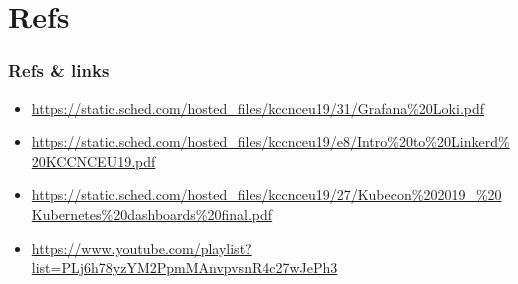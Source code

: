 \documentclass[default]{beamer}
\begin{document}
\section{Refs}
\begin{frame}
  \frametitle{Refs \& links}
  \begin{itemize}
    \item \url{https://static.sched.com/hosted_files/kccnceu19/31/Grafana\%20Loki.pdf}
    \item \url{https://static.sched.com/hosted_files/kccnceu19/e8/Intro\%20to\%20Linkerd\%20KCCNCEU19.pdf}
    \item \url{https://static.sched.com/hosted_files/kccnceu19/27/Kubecon\%202019_\%20Kubernetes\%20dashboards\%20final.pdf}
    \item \url{https://www.youtube.com/playlist?list=PLj6h78yzYM2PpmMAnvpvsnR4c27wJePh3}
  \end{itemize}
\end{frame}
\end{document}
